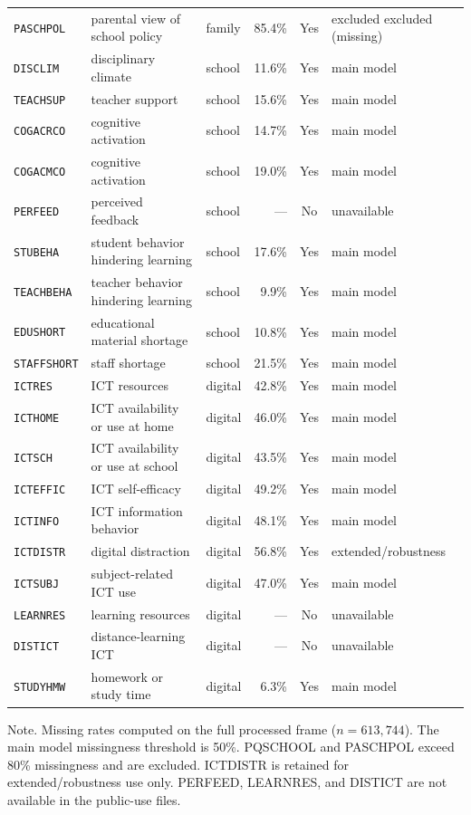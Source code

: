 \begin{table}[tb]
\begin{tabular}{@{}lllrcl@{}}
  \texttt{PASCHPOL} & parental view of school policy & family & 85.4\% & Yes & excluded excluded (missing) \\
  \texttt{DISCLIM} & disciplinary climate & school & 11.6\% & Yes & main model \\
  \texttt{TEACHSUP} & teacher support & school & 15.6\% & Yes & main model \\
  \texttt{COGACRCO} & cognitive activation & school & 14.7\% & Yes & main model \\
  \texttt{COGACMCO} & cognitive activation & school & 19.0\% & Yes & main model \\
  \texttt{PERFEED} & perceived feedback & school & --- & No & unavailable \\
  \texttt{STUBEHA} & student behavior hindering learning & school & 17.6\% & Yes & main model \\
  \texttt{TEACHBEHA} & teacher behavior hindering learning & school & 9.9\% & Yes & main model \\
  \texttt{EDUSHORT} & educational material shortage & school & 10.8\% & Yes & main model \\
  \texttt{STAFFSHORT} & staff shortage & school & 21.5\% & Yes & main model \\
  \texttt{ICTRES} & ICT resources & digital & 42.8\% & Yes & main model \\
  \texttt{ICTHOME} & ICT availability or use at home & digital & 46.0\% & Yes & main model \\
  \texttt{ICTSCH} & ICT availability or use at school & digital & 43.5\% & Yes & main model \\
  \texttt{ICTEFFIC} & ICT self-efficacy & digital & 49.2\% & Yes & main model \\
  \texttt{ICTINFO} & ICT information behavior & digital & 48.1\% & Yes & main model \\
  \texttt{ICTDISTR} & digital distraction & digital & 56.8\% & Yes & extended/robustness \\
  \texttt{ICTSUBJ} & subject-related ICT use & digital & 47.0\% & Yes & main model \\
  \texttt{LEARNRES} & learning resources & digital & --- & No & unavailable \\
  \texttt{DISTICT} & distance-learning ICT & digital & --- & No & unavailable \\
  \texttt{STUDYHMW} & homework or study time & digital & 6.3\% & Yes & main model \\
\bottomrule
\end{tabular}
\begin{tablenotes}
\item Note. Missing rates computed on the full processed frame ($n = 613{,}744$). The main model missingness threshold is 50\%. PQSCHOOL and PASCHPOL exceed 80\% missingness and are excluded. ICTDISTR is retained for extended/robustness use only. PERFEED, LEARNRES, and DISTICT are not available in the public-use files.
\end{tablenotes}
\end{table}
